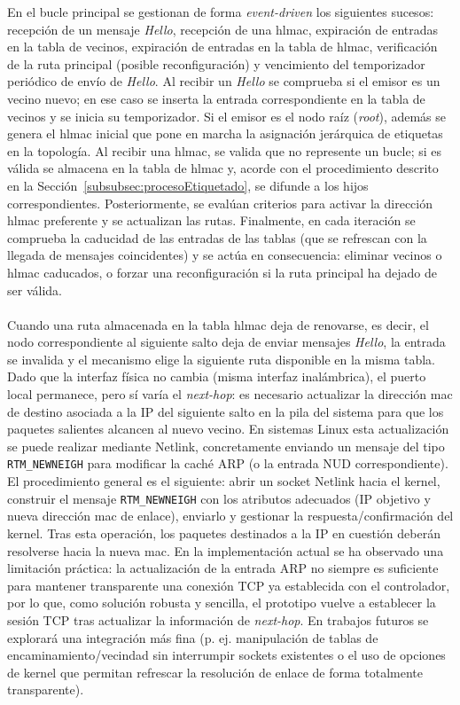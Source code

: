 En el bucle principal se gestionan de forma \textit{event-driven} los siguientes sucesos: recepción de un mensaje \textit{Hello}, recepción de una \gls{hlmac}, expiración de entradas en la tabla de vecinos, expiración de entradas en la tabla de \gls{hlmac}, verificación de la ruta principal (posible reconfiguración) y vencimiento del temporizador periódico de envío de \textit{Hello}. Al recibir un \textit{Hello} se comprueba si el emisor es un vecino nuevo; en ese caso se inserta la entrada correspondiente en la tabla de vecinos y se inicia su temporizador. Si el emisor es el nodo raíz (\textit{root}), además se genera el \gls{hlmac} inicial que pone en marcha la asignación jerárquica de etiquetas en la topología. Al recibir una \gls{hlmac}, se valida que no represente un bucle; si es válida se almacena en la tabla de \gls{hlmac} y, acorde con el procedimiento descrito en la Sección~\ref{subsubsec:procesoEtiquetado}, se difunde a los hijos correspondientes. Posteriormente, se evalúan criterios para activar la dirección \gls{hlmac} preferente y se actualizan las rutas. Finalmente, en cada iteración se comprueba la caducidad de las entradas de las tablas (que se refrescan con la llegada de mensajes coincidentes) y se actúa en consecuencia: eliminar vecinos o \gls{hlmac} caducados, o forzar una reconfiguración si la ruta principal ha dejado de ser válida.\\
\\
Cuando una ruta almacenada en la tabla \gls{hlmac} deja de renovarse, es decir, el nodo correspondiente al siguiente salto deja de enviar mensajes \textit{Hello}, la entrada se invalida y el mecanismo elige la siguiente ruta disponible en la misma tabla. Dado que la interfaz física no cambia (misma interfaz inalámbrica), el puerto local permanece, pero sí varía el \textit{next-hop}: es necesario actualizar la dirección \gls{mac} de destino asociada a la IP del siguiente salto en la pila del sistema para que los paquetes salientes alcancen al nuevo vecino. En sistemas Linux esta actualización se puede realizar mediante Netlink, concretamente enviando un mensaje del tipo \texttt{RTM\_NEWNEIGH} para modificar la caché ARP (o la entrada NUD correspondiente). El procedimiento general es el siguiente: abrir un socket Netlink hacia el kernel, construir el mensaje \texttt{RTM\_NEWNEIGH} con los atributos adecuados (IP objetivo y nueva dirección \gls{mac} de enlace), enviarlo y gestionar la respuesta/confirmación del kernel. Tras esta operación, los paquetes destinados a la IP en cuestión deberán resolverse hacia la nueva \gls{mac}. En la implementación actual se ha observado una limitación práctica: la actualización de la entrada ARP no siempre es suficiente para mantener transparente una conexión TCP ya establecida con el controlador, por lo que, como solución robusta y sencilla, el prototipo vuelve a establecer la sesión TCP tras actualizar la información de \textit{next-hop}. En trabajos futuros se explorará una integración más fina (p. ej. manipulación de tablas de encaminamiento/vecindad sin interrumpir sockets existentes o el uso de opciones de kernel que permitan refrescar la resolución de enlace de forma totalmente transparente).\\
